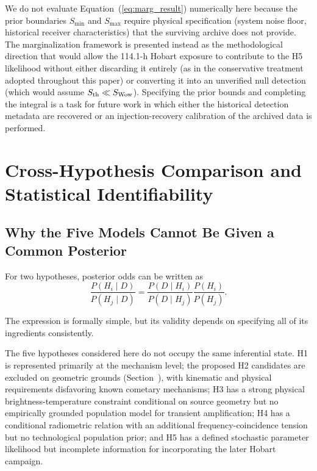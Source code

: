 \documentclass[twocolumn]{aastex701}
\begin{document}
We do not evaluate Equation~(\ref{eq:marg_result}) numerically here because the prior boundaries $S_{\min}$ and $S_{\max}$ require physical specification (system noise floor, historical receiver characteristics) that the surviving archive does not provide. The marginalization framework is presented instead as the methodological direction that would allow the 114.1-h Hobart exposure to contribute to the H5 likelihood without either discarding it entirely (as in the conservative treatment adopted throughout this paper) or converting it into an unverified null detection (which would assume $S_{\rm th}\ll S_{\rm Wow}$). Specifying the prior bounds and completing the integral is a task for future work in which either the historical detection metadata are recovered or an injection-recovery calibration of the archived data is performed.


\section{Cross-Hypothesis Comparison and Statistical Identifiability}
\label{sec:comparison}

\subsection{Why the Five Models Cannot Be Given a Common Posterior}

For two hypotheses, posterior odds can be written as
\begin{equation}
\frac{P(H_i\mid D)}{P(H_j\mid D)}
=
\frac{P(D\mid H_i)}{P(D\mid H_j)}
\frac{P(H_i)}{P(H_j)}.
\label{eq:odds}
\end{equation}

The expression is formally simple, but its validity depends on specifying all of its ingredients consistently.

The five hypotheses considered here do not occupy the same inferential state. H1 is represented primarily at the mechanism level; the proposed H2 candidates are excluded on geometric grounds (Section~), with kinematic and physical requirements disfavoring known cometary mechanisms; H3 has a strong physical brightness-temperature constraint conditional on source geometry but no empirically grounded population model for transient  amplification; H4 has a conditional radiometric relation with an additional frequency-coincidence tension but no technological population prior; and H5 has a defined stochastic parameter likelihood but incomplete information for incorporating the later Hobart campaign.
\end{document}
